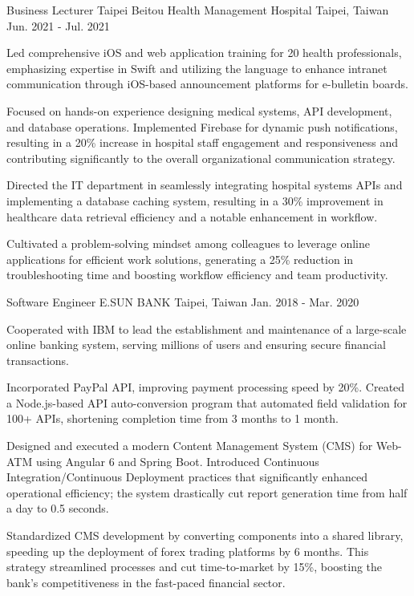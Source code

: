 \begin{cventries}
  \cventry
  {Business Lecturer} %
  {Taipei Beitou Health Management Hospital} %
  {Taipei, Taiwan} %
  {Jun. 2021 - Jul. 2021} %
  {
    \begin{cvitems} %
      \item {Led comprehensive iOS and web application training for 20 health professionals, emphasizing expertise in Swift and utilizing the language to enhance intranet communication through iOS-based announcement platforms for e-bulletin boards.}
      \item {Focused on hands-on experience designing medical systems, API development, and database operations. Implemented Firebase for dynamic push notifications, resulting in a 20\% increase in hospital staff engagement and responsiveness and contributing significantly to the overall organizational communication strategy.}
      \item {Directed the IT department in seamlessly integrating hospital systems APIs and implementing a database caching system, resulting in a 30\% improvement in healthcare data retrieval efficiency and a notable enhancement in workflow.}
      \item {Cultivated a problem-solving mindset among colleagues to leverage online applications for efficient work solutions, generating a 25\% reduction in troubleshooting time and boosting workflow efficiency and team productivity.}
    \end{cvitems}
  }

  \cventry
    {Software Engineer} %
    {E.SUN BANK} %
    {Taipei, Taiwan} %
    {Jan. 2018 - Mar. 2020} %
    {
      \begin{cvitems} %
        \item {Cooperated with IBM to lead the establishment and maintenance of a large-scale online banking system, serving millions of users and ensuring secure financial transactions.}
        \item {Incorporated PayPal API, improving payment processing speed by 20\%. Created a Node.js-based API auto-conversion program that automated field validation for 100+ APIs, shortening completion time from 3 months to 1 month.}
        \item {Designed and executed a modern Content Management System (CMS) for Web-ATM using Angular 6 and Spring Boot. Introduced Continuous Integration/Continuous Deployment practices that significantly enhanced operational efficiency; the system drastically cut report generation time from half a day to 0.5 seconds.}
        \item {Standardized CMS development by converting components into a shared library, speeding up the deployment of forex trading platforms by 6 months. This strategy streamlined processes and cut time-to-market by 15\%, boosting the bank's competitiveness in the fast-paced financial sector.}
      \end{cvitems}
    }


\end{cventries}
